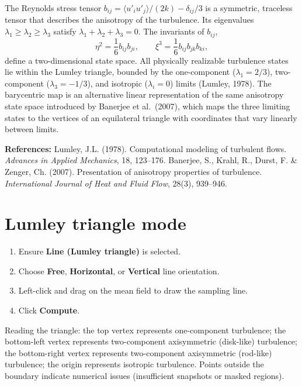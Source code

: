 \documentclass[11pt, a4paper]{report}
\newcommand{\uipth}[1]{\textbf{\textcolor{upblue}{#1}}}
\begin{document}
The Reynolds stress tensor $b_{ij} = \langle u'_i u'_j \rangle / (2k) - \delta_{ij}/3$ is a symmetric, traceless tensor that describes the anisotropy of the turbulence. Its eigenvalues $\lambda_1 \geq \lambda_2 \geq \lambda_3$ satisfy $\lambda_1 + \lambda_2 + \lambda_3 = 0$. The invariants of $b_{ij}$,
\[
\eta^2 = \frac{1}{6} b_{ij} b_{ji}, \qquad \xi^3 = \frac{1}{6} b_{ij} b_{jk} b_{ki},
\]
define a two-dimensional state space. All physically realizable turbulence states lie within the Lumley triangle, bounded by the one-component ($\lambda_1 = 2/3$), two-component ($\lambda_3 = -1/3$), and isotropic ($\lambda_i = 0$) limits (Lumley, 1978). The barycentric map is an alternative linear representation of the same anisotropy state space introduced by Banerjee et al.\ (2007), which maps the three limiting states to the vertices of an equilateral triangle with coordinates that vary linearly between limits.

\noindent\textbf{References:} Lumley, J.L. (1978). Computational modeling of turbulent flows. \textit{Advances in Applied Mechanics}, 18, 123--176. Banerjee, S., Krahl, R., Durst, F. \& Zenger, Ch. (2007). Presentation of anisotropy properties of turbulence. \textit{International Journal of Heat and Fluid Flow}, 28(3), 939--946.

\section{Lumley triangle mode}

\begin{stepbox}
\begin{enumerate}[leftmargin=1.5em, topsep=2pt]
  \item Ensure \uipth{Line (Lumley triangle)} is selected.
  \item Choose \uipth{Free}, \uipth{Horizontal}, or \uipth{Vertical} line orientation.
  \item Left-click and drag on the mean field to draw the sampling line.
  \item Click \uipth{Compute}.
\end{enumerate}
\end{stepbox}

Reading the triangle: the top vertex represents one-component turbulence; the bottom-left vertex represents two-component axisymmetric (disk-like) turbulence; the bottom-right vertex represents two-component axisymmetric (rod-like) turbulence; the origin represents isotropic turbulence. Points outside the boundary indicate numerical issues (insufficient snapshots or masked regions).
\end{document}

